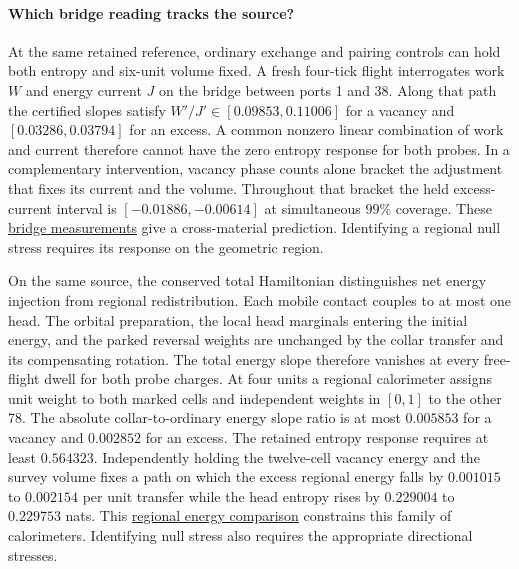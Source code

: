 \documentclass[11pt]{article}
\begin{document}
\paragraph{Which bridge reading tracks the source?}
At the same retained reference, ordinary exchange and pairing controls
can hold both entropy and six-unit volume fixed. A fresh four-tick
flight interrogates work $W$ and energy current $J$ on the bridge
between ports 1 and 38. Along that path the certified slopes satisfy
$W'/J'\in[0.09853,0.11006]$ for a vacancy and
$[0.03286,0.03794]$ for an excess. A common nonzero linear combination
of work and current therefore cannot have the zero entropy response
for both probes. In a complementary intervention, vacancy phase counts
alone bracket the adjustment that fixes its current and the volume.
Throughout that bracket the held excess-current interval is
$[-0.01886,-0.00614]$ at simultaneous $99\%$ coverage. These
\href{https://github.com/FloatingPragma/observer-patch-holography/tree/main/code/matched_einstein_limit/source_implication/full_algebra/reuse/retained_equilibrium/bridge_stress}{bridge measurements}
give a cross-material prediction. Identifying a regional null stress
requires its response on the geometric region.

On the same source, the conserved total Hamiltonian distinguishes net
energy injection from regional redistribution. Each mobile contact
couples to at most one head. The orbital preparation, the local head
marginals entering the initial energy, and the parked reversal weights
are unchanged by the collar transfer and its compensating rotation.
The total energy slope therefore vanishes at every free-flight dwell
for both probe charges. At four units a regional calorimeter assigns
unit weight to both marked cells and independent weights in $[0,1]$
to the other 78. The absolute collar-to-ordinary energy slope ratio
is at most $0.005853$ for a vacancy and $0.002852$ for an excess.
The retained entropy response requires at least $0.564323$.
Independently holding the twelve-cell vacancy energy and the survey
volume fixes a path on which the excess regional energy falls
by $0.001015$ to $0.002154$ per unit transfer while the head entropy
rises by $0.229004$ to $0.229753$ nats. This
\href{https://github.com/FloatingPragma/observer-patch-holography/tree/main/code/matched_einstein_limit/source_implication/full_algebra/reuse/retained_equilibrium/regional_energy}{regional energy comparison}
constrains this family of calorimeters. Identifying null stress also
requires the appropriate directional stresses.
\end{document}

